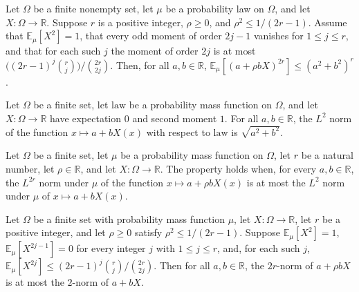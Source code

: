 \begin{theorem}
\label{FABL.affine_evenMoment_le_of_momentConditions}
\leanok
{}
Let $\Omega$ be a finite nonempty set, let $\mu$ be a probability law on $\Omega$, and
let $X:\Omega\to\mathbb R$. Suppose $r$ is a positive integer, $\rho\ge0$, and
$\rho^2\le 1/(2r-1)$. Assume that $\mathbb E_\mu[X^2]=1$, that every odd moment of order
$2j-1$ vanishes for $1\le j\le r$, and that for each such $j$ the moment of order $2j$
is at most $\big((2r-1)^j\binom rj\big)/\binom{2r}{2j}$. Then, for all $a,b\in\mathbb
R$, $\mathbb E_\mu[(a+\rho bX)^{2r}]\le(a^2+b^2)^r$.
\end{theorem}

\begin{theorem}
\label{FABL.pmfLpNorm_two_affine_centered}
\leanok
{}
Let $\Omega$ be a finite set, let $\mathrm{law}$ be a probability mass function on
$\Omega$, and let $X:\Omega\to\mathbb{R}$ have expectation $0$ and second moment $1$.
For all $a,b\in\mathbb{R}$, the $L^2$ norm of the function $x\mapsto a+bX(x)$ with
respect to $\mathrm{law}$ is $\sqrt{a^2+b^2}$.
\end{theorem}

\begin{definition}
\label{FABL.IsPmfTwoEvenHypercontractive}
\leanok
{}
Let $\Omega$ be a finite set, let $\mu$ be a probability mass function on $\Omega$, let
$r$ be a natural number, let $\rho\in\mathbb R$, and let $X:\Omega\to\mathbb R$. The
property holds when, for every $a,b\in\mathbb R$, the $L^{2r}$ norm under $\mu$ of the
function $x\mapsto a+\rho bX(x)$ is at most the $L^2$ norm under $\mu$ of $x\mapsto
a+bX(x)$.
\end{definition}

\begin{theorem}
\label{FABL.isPmfTwoEvenHypercontractive_of_momentConditions}
\leanok
{}
Let $\Omega$ be a finite set with probability mass function $\mu$, let
$X:\Omega\to\mathbb{R}$, let $r$ be a positive integer, and let $\rho\ge0$ satisfy
$\rho^2\le 1/(2r-1)$. Suppose $\mathbb{E}_{\mu}[X^2]=1$, $\mathbb{E}_{\mu}[X^{2j-1}]=0$
for every integer $j$ with $1\le j\le r$, and, for each such $j$,
$\mathbb{E}_{\mu}[X^{2j}]\le (2r-1)^j\binom{r}{j}/\binom{2r}{2j}$. Then for all
$a,b\in\mathbb{R}$, the $2r$-norm of $a+\rho bX$ is at most the $2$-norm of $a+bX$.
\end{theorem}

